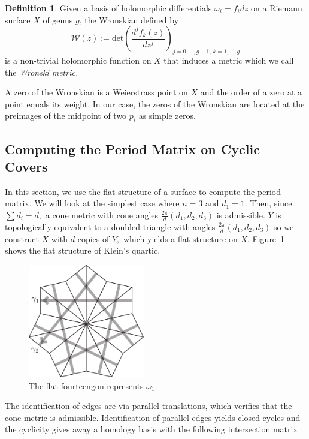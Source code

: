 \documentclass[12pt,reqno]{amsart}
\theoremstyle{definition}
\newtheorem{defn}{Definition}
\theoremstyle{remark}
\begin{document}
\begin{defn}\label{def: wronski} Given a basis of holomorphic differentials $\omega_i = f_i d z$ on a Riemann surface $X$ of genus $g$, the Wronskian defined by $$\mathcal{W}(z) := \textrm{det} \left( \frac{d^j f_k(z)}{d z^j} \right)_{j = 0, \ldots , g - 1, \, k = 1, \ldots , g}$$ is a non-trivial holomorphic function on $X$ that induces a metric which we call the \textit{Wronski metric.} 
\end{defn}

A zero of the Wronskian is a Weierstrass point on $X$ and the order of a zero at a point equals its weight. In our case, the zeros of the Wronskian are located at the preimages of the midpoint of two $p_i$ as simple zeros.

\subsection{Computing the Period Matrix on Cyclic Covers}
\label{sec:cyclicperiod}
In this section, we use the flat structure of a surface to compute the period matrix. We will look at the simplest case where $n = 3$ and $d_1 = 1.$ Then, since $\sum d_i = d,$ a cone metric with cone angles $\frac{2 \pi}{d}(d_1, d_2, d_3)$ is admissible. $Y$ is topologically equivalent to a doubled triangle with angles $\frac{2 \pi}{d}(d_1, d_2, d_3)$ so we construct $X$ with $d$ copies of $Y,$ which yields a flat structure on $X.$ Figure~\ref{fig: 124_flat} shows the flat structure of Klein's quartic.  

\begin{figure}[htbp] %
   \centering
   \includegraphics[width=2in]{figures/124_flat} 
	\caption{The flat fourteengon represents $\omega_1$}
	\label{fig: 124_flat}
\end{figure}

The identification of edges are via parallel translations, which verifies that the cone metric is admissible. Identification of parallel edges yields closed cycles and the cyclicity gives away a homology basis with the following intersection matrix
\end{document}
